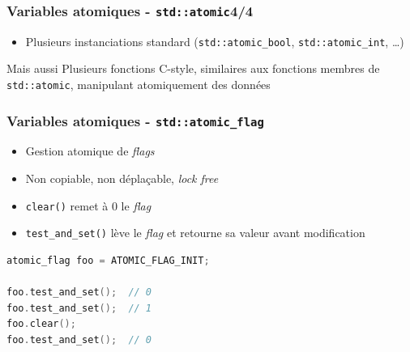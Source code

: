 \documentclass[C++.tex]{subfiles}
\begin{document}
\begin{frame}[fragile]
	\frametitle{Variables atomiques - \lstinline|std::atomic|\titlehfill{}4/4}
	\begin{itemize}
		\item Plusieurs instanciations standard (\lstinline|std::atomic_bool|, \lstinline|std::atomic_int|, \ldots)
	\end{itemize}

	\begin{block}{Mais aussi}
		Plusieurs fonctions \og C-style\fg{}, similaires aux fonctions membres de \lstinline|std::atomic|, manipulant atomiquement des données
	\end{block}
\end{frame}

\begin{frame}[fragile]
	\frametitle{Variables atomiques - \lstinline|std::atomic_flag|}
	\begin{itemize}
		\item Gestion atomique de \textit{flags}
		\item Non copiable, non déplaçable, \textit{lock free}
		\item \lstinline|clear()| remet à 0 le \textit{flag}
		\item \lstinline|test_and_set()| lève le \textit{flag} et retourne sa valeur avant modification
	\end{itemize}

	\begin{lstlisting}[language=C++]
atomic_flag foo = ATOMIC_FLAG_INIT;

foo.test_and_set();  // 0
foo.test_and_set();  // 1
foo.clear();
foo.test_and_set();  // 0\end{lstlisting}
\end{frame}
\end{document}
